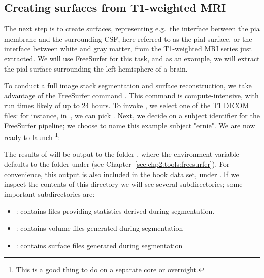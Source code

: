 \subsection{Creating surfaces from T1-weighted MRI}
\label{sec:chp3:surfaces}

The next step is to create surfaces, representing e.g.~the interface
between the pia membrane and the surrounding CSF, here referred to as
the pial surface, or the interface between white and gray matter, from
the T1-weighted MRI series just extracted. We will use FreeSurfer for
this task, and as an example, we will extract the pial surface
surrounding the left hemisphere of a brain.

To conduct a full image stack segmentation and surface reconstruction,
we take advantage of the FreeSurfer command . This
command is compute-intensive, with run times likely of up to 24
hours. To invoke , we select one of the T1 DICOM files:
for instance, in~, we can pick . Next, we
decide on a subject identifier for the FreeSurfer pipeline; we choose
to name this example subject "ernie". We are now ready to launch
\footnote{This is a good thing to do on a separate
  core or overnight.}:


The results of  will be output to the folder
, where the environment variable
 defaults to the  folder under
 (see
Chapter~\ref{sec:chp2:tools:freesurfer}). For convenience, this output
is also included in the book data set, under \emp{\ernieoutput}. If we
inspect the contents of this directory we will see several
subdirectories; some important subdirectories are:
\begin{itemize}
\item {}: contains files providing statistics derived during segmentation.
\item {}: contains volume files generated during segmentation
\item {}: contains surface files generated during segmentation
\end{itemize}

